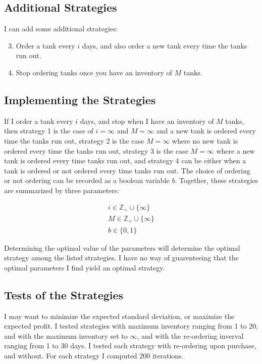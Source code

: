 \documentclass{article}
\begin{document}
\subsection{Additional Strategies}

I can add some additional strategies:

\begin{enumerate}
\setcounter{enumi}{2}
\item Order a tank every $i$ days, and also order a new tank every 
	time the tanks run out.
\item Stop ordering tanks once you have an inventory of $M$ tanks.
\end{enumerate}

\subsection{Implementing the Strategies}

If I order a tank every $i$ days, and stop when I have an inventory
	of $M$ tanks, then strategy 1 is the case of $i = \infty$
	and $M = \infty$ and a new tank is ordered every time the tanks run out,
	strategy 2 is the case $M = \infty$ where no new tank is ordered
	every time the tanks run out,
	strategy 3 is the case $M = \infty$ where a new tank is ordered
	every time tanks run out, and strategy 4 can be either when a tank
	is ordered or not ordered every time tanks run out.
The choice of ordering or not ordering can be recorded as a boolean 
	variable $b$.
Together, these strategies are summarized by three parameters:

\begin{align*}
i \in \mathbb{Z}_+ \cup \{ \infty \} \\
M \in \mathbb{Z}_+ \cup \{ \infty \} \\
b \in \{ 0, 1 \} 
\end{align*}

Determining the optimal value of the parameters will determine the optimal
	strategy among the listed strategies.
I have no way of guarenteeing that the optimal parameters I find
	yield an optimal strategy.

\subsection{Tests of the Strategies}

I may want to minimize the expected standard deviation, or maximize the
	expected profit.
I tested strategies with maximum inventory ranging from 1 to 20, and with 
	the maximum inventory set to $\infty$, and with the re-ordering inverval
	ranging from 1 to 30 days.
I tested each strategy with re-ordering upon purchase, and without.
For each strategy I computed 200 iterations.
\end{document}

